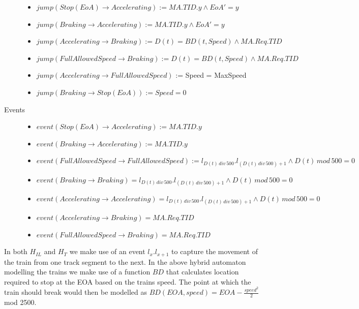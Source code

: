 \begin{mydef}
\begin{description}
\begin{itemize}
	\item $jump(Stop (EoA) \to Accelerating) := MA.TID.y \wedge EoA' = y$ 
	
	\item $jump(Braking \to Accelerating) := MA.TID.y \wedge EoA' = y$ 

	\item $jump(Accelerating \to Braking) := D(t) = BD(t, Speed) \wedge MA.Req.TID$

	\item $jump(Full Allowed Speed \to Braking) := D(t) = BD(t, Speed) \wedge MA.Req.TID$

	\item $jump(Accelerating \to Full Allowed Speed)$ := Speed = MaxSpeed
	
	\item $jump(Braking \to Stop (EoA)) := Speed = 0$

	\end{itemize}

\item[Events] \hspace*{0mm}
\begin{itemize}
	\item $event (Stop (EoA) \to Accelerating) := MA.TID.y$
	\item $event (Braking \to Accelerating) := MA.TID.y$
	\item $event(Full Allowed Speed \to Full Allowed Speed) := l_{D(t) \, div \, 500}.l_{(D(t) \, div \, 500) +1} \wedge D(t) \, mod \, 500 = 0$
\item $event(Braking \to Braking) = l_{D(t) \, div \, 500}.l_{(D(t) \, div \, 500) +1} \wedge D(t) \, mod \, 500 = 0$
\item $event(Accelerating \to Accelerating) = l_{D(t) \, div \, 500}.l_{(D(t) \, div \, 500) +1} \wedge D(t) \, mod \, 500 = 0$

	\item $event(Accelerating \to Braking) = MA.Req.TID$
	\item $event(Full Allowed Speed \to Braking) = MA.Req.TID$
\end{itemize}

\end{description}
\end{mydef}

In both $H_{IL}$ and $H_T$ we make use of an event $l_x.l_{x+1}$ to capture the movement of the train from one track segment to the next. In the above hybrid automaton modelling the trains we make use of a function $BD$ that calculates location required to stop at the EOA based on the trains speed. The point at which the train should break would then be modelled as $BD(EOA, speed) = EOA - \frac{speed ^2}{2}$ mod 2500.



